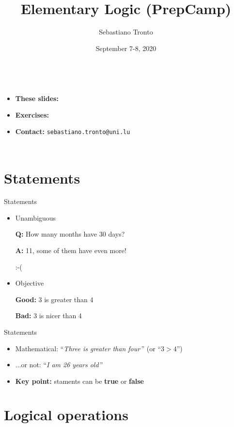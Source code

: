 \documentclass[11pt]{beamer}
\author{Sebastiano Tronto}
\title{Elementary Logic (PrepCamp)}
\institute{uni.lu}
\date{September 7-8, 2020}
\makeatletter
\theoremstyle{definition}
\newcommand{\refgithub}{
  \begin{itemize}
    \item \textbf{These slides:}
    \item \textbf{Exercises:}
    \item \textbf{Contact:} \texttt{sebastiano.tronto@uni.lu}
  \end{itemize}
}
\makeatother
\begin{document}
\begin{frame}
\titlepage
\end{frame}

\begin{frame}
  \begin{columns}
    \tableofcontents
    \refgithub
  \end{columns}
\end{frame}


\section{Statements}
\begin{frame}{Statements}
\begin{itemize}
    \pause
 \item Unambiguous
   \pause
\begin{example}
\textbf{Q:} How many months have 30 days?
\pause

\textbf{A:} 11, some of them have even more!
\pause

:-(
\end{example}
\pause
 \item Objective
   \pause
\begin{example}
\textbf{Good:} 3 is greater than 4

\textbf{Bad:} 3 is nicer than 4
\end{example}
\end{itemize}
\end{frame}

\begin{frame}{Statements}
  \begin{itemize}
 \item Mathematical: ``\emph{Three is greater than four}\,''
                    (or ``$3 > 4$'')
 \item ...or not: ``\emph{I am 26 years old}\,''
 \item \textbf{Key point:} staments can be \textbf{true} or
                     \textbf{false}
\end{itemize}
\end{frame}



\section{Logical operations}
\end{document}
